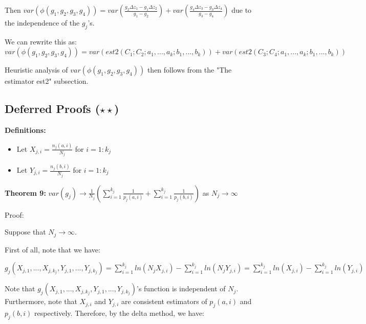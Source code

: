 \documentclass{article}
\begin{document}
Then $\displaystyle var\left( \phi \left( g_{1} ,g_{2} ,g_{3} ,g_{4}\right)\right) =var\left(\frac{g_{2} \Delta z_{1} -g_{1} \Delta z_{2}}{g_{1} -g_{2}}\right) +var\left(\frac{g_{4} \Delta z_{3} -g_{3} \Delta z_{4}}{g_{3} -g_{4}}\right)$ due to the independence of the $\displaystyle g_{j}$'s.



We can rewrite this as: $\displaystyle var\left( \phi \left( g_{1} ,g_{2} ,g_{3} ,g_{4}\right)\right) =var\left( est2\left( C_{1} ;C_{2} ;a_{1} ,...,a_{k} ;b_{1} ,...,b_{k}\right)\right) +var\left( est2\left( C_{3} ;C_{4} ;a_{1} ,...,a_{k} ;b_{1} ,...,b_{k}\right)\right)$



Heuristic analysis of $\displaystyle var\left( \phi \left( g_{1} ,g_{2} ,g_{3} ,g_{4}\right)\right)$ then follows from the "The estimator est2" subsection.


\subsection{Deferred Proofs ($\star\star$)}

\textbf{Definitions:}
\begin{itemize}
\item Let $\displaystyle X_{j,i} =\frac{n_{j}\left( a,i\right)}{N_{j}}$ for $\displaystyle i=1:k_{j}$
\item Let $\displaystyle Y_{j,i} =\frac{n_{j}\left( b,i\right)}{N_{j}}$ for $\displaystyle i=1:k_{j}$
\end{itemize}

\textbf{Theorem 9:} $\displaystyle var\left( g_{j}\right)\rightarrow \frac{1}{N_{j}}\left(\sum _{i=1}^{k_{j}}\frac{1}{p_{j}\left( a,i\right)} +\sum _{i=1}^{k_{j}}\frac{1}{p_{j}\left( b,i\right)}\right)$ as $\displaystyle N_{j}\rightarrow \infty $

Proof:

Suppose that $\displaystyle N_{j}\rightarrow \infty $.

First of all, note that we have:

$\displaystyle g_{j}\left( X_{j,1} ,...,X_{j,k_{j}} ,Y_{j,1} ,...,Y_{j,k_{j}}\right) =\sum _{i=1}^{k_{j}} ln\left( N_{j} X_{j,i}\right) -\sum _{i=1}^{k_{j}} ln\left( N_{j} Y_{j,i}\right) =\sum _{i=1}^{k_{j}} ln\left( X_{j,i}\right) -\sum _{i=1}^{k_{j}} ln\left( Y_{j,i}\right)$

Note that $\displaystyle g_{j}\left( X_{j,1} ,...,X_{j,k_{j}} ,Y_{j,1} ,...,Y_{j,k_{j}}\right)$'s function is independent of $\displaystyle N_{j}$. Furthermore, note that $\displaystyle X_{j,i}$ and $\displaystyle Y_{j,i}$ are consistent estimators of $\displaystyle p_{j}\left( a,i\right)$ and $\displaystyle p_{j}\left( b,i\right)$ respectively. Therefore, by the delta method, we have:
\end{document}
